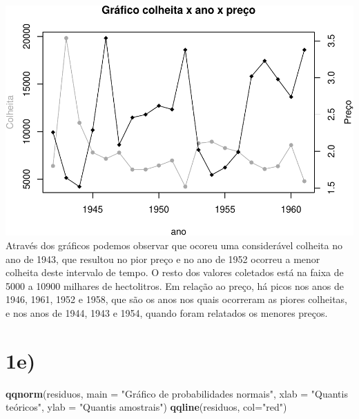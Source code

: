 \documentclass[11pt,]{article}
\makeatletter
\newenvironment{Shaded}{\begin{snugshade}}{\end{snugshade}}
\newcommand{\KeywordTok}[1]{\textcolor[rgb]{0.13,0.29,0.53}{\textbf{{#1}}}}
\newcommand{\DataTypeTok}[1]{\textcolor[rgb]{0.13,0.29,0.53}{{#1}}}
\newcommand{\StringTok}[1]{\textcolor[rgb]{0.31,0.60,0.02}{{#1}}}
\newcommand{\NormalTok}[1]{{#1}}
\def\maxwidth{\ifdim\Gin@nat@width>\linewidth\linewidth
\else\Gin@nat@width\fi}
\let\Oldincludegraphics\includegraphics
\renewcommand{\includegraphics}[1]{\Oldincludegraphics[width=\maxwidth]{#1}}
\makeatother
\begin{document}
\includegraphics{versaofinal_lista3_files/figure-latex/unnamed-chunk-6-1.pdf}
Através dos gráficos podemos observar que ocoreu uma considerável
colheita no ano de 1943, que resultou no pior preço e no ano de 1952
ocorreu a menor colheita deste intervalo de tempo. O resto dos valores
coletados está na faixa de 5000 a 10900 milhares de hectolitros. Em
relação ao preço, há picos nos anos de 1946, 1961, 1952 e 1958, que são
os anos nos quais ocorreram as piores colheitas, e nos anos de 1944,
1943 e 1954, quando foram relatados os menores preços.

\section{1e)}\label{e}

\begin{Shaded}
\begin{Highlighting}[]
\KeywordTok{qqnorm}\NormalTok{(residuos, }
       \DataTypeTok{main =} \StringTok{"Gráfico de probabilidades normais"}\NormalTok{, }
       \DataTypeTok{xlab =} \StringTok{"Quantis teóricos"}\NormalTok{, }
       \DataTypeTok{ylab =} \StringTok{"Quantis amostrais"}\NormalTok{)}
\KeywordTok{qqline}\NormalTok{(residuos, }\DataTypeTok{col=}\StringTok{"red"}\NormalTok{)}
\end{Highlighting}
\end{Shaded}
\end{document}
